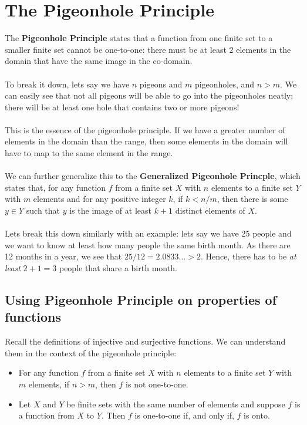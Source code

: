 \documentclass[a4paper]{article}
\begin{document}
\section{The Pigeonhole Principle}
The \textbf{Pigeonhole Principle} states that a function from one finite set to a smaller finite set cannot be one-to-one: there must be at least 2 elements in the domain that have the same image in the co-domain.\\\\
To break it down, lets say we have $n$ pigeons and $m$ pigeonholes, and $n>m$. We can easily see that not all pigeons will be able to go into the pigeonholes neatly; there will be at least one hole that contains two or more pigeons!\\\\
This is the essence of the pigeonhole principle. If we have a greater number of elements in the domain than the range, then some elements in the domain will have to map to the same element in the range.\\\\
We can further generalize this to the \textbf{Generalized Pigeonhole Princple}, which states that, for any function $f$ from a finite set $X$ with $n$ elements to a finite set $Y$ with $m$ elements and for any positive integer $k$, if $k < n/m$, then there is some $y \in Y$ such that $y$ is the image of at least $k+1$ distinct elements of $X$.\\\\
Lets break this down similarly with an example: lets say we have 25 people and we want to know at least how many people the same birth month. As there are 12 months in a year, we see that $25/12 = 2.0833... > 2$. Hence, there has to be \textit{at least} $2+1 = 3$ people that share a birth month.

\subsection{Using Pigeonhole Principle on properties of functions}
Recall the definitions of injective and surjective functions. We can understand them in the context of the pigeonhole principle:
\begin{itemize}
	\item For any function $f$ from a finite set $X$ with $n$ elements to a finite set $Y$ with $m$ elements, if $n>m$, then $f$ is not one-to-one.
	\item Let $X$ and $Y$ be finite sets with the same number of elements and suppose $f$ is a function from $X$ to $Y$. Then $f$ is one-to-one if, and only if, $f$ is onto.
\end{itemize}
\end{document}
